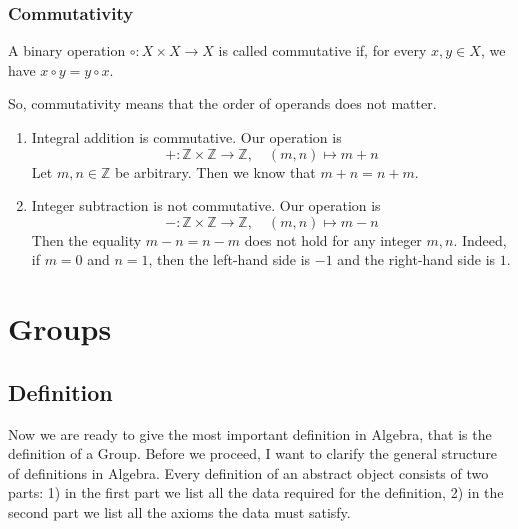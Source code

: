 \subsubsection{Commutativity}

\begin{definition}
A binary operation $\circ \colon X\times X\to X$ is called commutative if, for every $x,y\in X$, we have $x \circ y = y\circ x$.
\end{definition}

So, commutativity means that the order of operands does not matter.

\begin{examples}
\begin{enumerate}
\item Integral addition is commutative.
Our operation is
\[
+\colon \mathbb Z\times \mathbb Z\to \mathbb Z,\quad (m,n)\mapsto m+n
\]
Let $m,n\in \mathbb Z$ be arbitrary.
Then we know that $m + n = n + m$.

\item Integer subtraction is not commutative.
Our operation is
\[
-\colon \mathbb Z\times \mathbb Z\to \mathbb Z,\quad (m,n)\mapsto m-n
\]
Then the equality $m - n = n - m$ does not hold for any integer $m,n$.
Indeed, if $m = 0$ and $n = 1$, then the left-hand side is $-1$ and the right-hand side is $1$.
\end{enumerate}
\end{examples}

\section{Groups}

\subsection{Definition}

Now we are ready to give the most important definition in Algebra, that is the definition of a Group.
Before we proceed, I want to clarify the general structure of definitions in Algebra.
Every definition of an abstract object consists of two parts: 1) in the first part we list all the data required for the definition, 2) in the second part we list all the axioms the data must satisfy.

